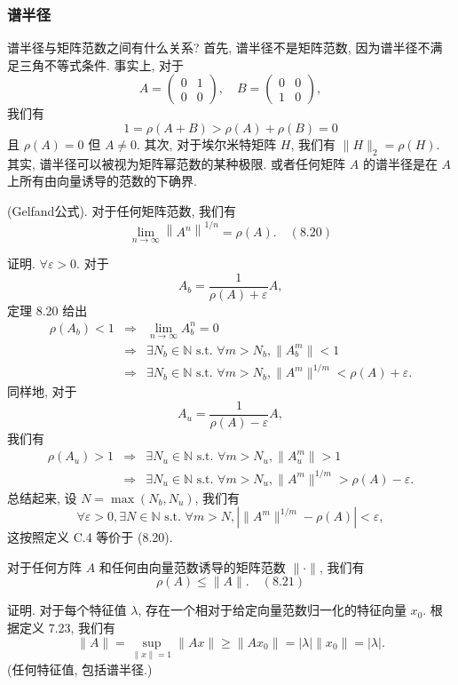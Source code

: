 \documentclass[a4paper]{ctexart}
\newcommand{\hl}[1]
{\noindent {\bf {#1}}}
\begin{document}
{\subsubsection{谱半径}

谱半径与矩阵范数之间有什么关系? 首先, 谱半径不是矩阵范数, 
因为谱半径不满足三角不等式条件. 事实上, 对于
$$
A = \begin{pmatrix} 0 & 1 \\ 0 & 0 \end{pmatrix}, 
\quad B = \begin{pmatrix} 0 & 0 \\ 1 & 0 \end{pmatrix}, 
$$
我们有 
$$ 
1 = \rho(A + B) > \rho(A) + \rho(B) = 0
$$ 
且 $\rho(A) = 0$ 但 $A \neq 0$. 
其次, 对于埃尔米特矩阵 $H$, 我们有 $\|H\|_2 = \rho(H)$. 
其实, 谱半径可以被视为矩阵幂范数的某种极限. 
或者任何矩阵 $A$ 的谱半径是在 $A$ 上所有由向量诱导的范数的下确界.

\hl{定理 8.24} (Gelfand公式). 
对于任何矩阵范数, 我们有
$$ 
\lim_{n \to \infty} \left\| A^n \right\|^{1/n} = \rho(A). \quad (8.20) 
$$

证明. $\forall \varepsilon > 0$. 对于 
$$
A_b = \frac{1}{\rho(A) + \varepsilon}A,
$$
定理 8.20 给出
\begin{eqnarray*}
\rho(A_b) < 1 &\Rightarrow& \lim_{n \to \infty} A^n_b = 0 \\
&\Rightarrow& \exists N_b \in \mathbb{N} \text{ s.t. } 
\forall m > N_b, \|A^m_b\| < 1 \\
&\Rightarrow& \exists N_b \in \mathbb{N} \text{ s.t. } \forall m > N_b, 
\|A^m\|^{1/m} < \rho(A) + \varepsilon. 
\end{eqnarray*}
同样地, 对于 
$$
A_u = \frac{1}{\rho(A) - \varepsilon}A,
$$
我们有
\begin{eqnarray*}
\rho(A_u) > 1 &\Rightarrow& 
\exists N_u \in \mathbb{N} \text{ s.t. } \forall m > N_u, \|A^m_u\| > 1 \\
&\Rightarrow& \exists N_u \in \mathbb{N} \text{ s.t. } \forall m > N_u, 
\|A^m\|^{1/m} > \rho(A) - \varepsilon. 
\end{eqnarray*}
总结起来, 设 $N = \max(N_b, N_u)$, 我们有
$$
\forall \varepsilon > 0, 
\exists N \in \mathbb{N} \text{ s.t. } \forall m > N, 
\left| \|A^m\|^{1/m} - \rho(A) \right| < \varepsilon, 
$$
这按照定义 C.4 等价于 (8.20).

\hl{引理 8.25} 对于任何方阵 $A$ 和任何由向量范数诱导的矩阵范数 $\|\cdot\|$, 
我们有
$$ 
\rho(A) \leq \|A\|. \quad (8.21) 
$$

证明. 对于每个特征值 $\lambda$, 
存在一个相对于给定向量范数归一化的特征向量 $x_0$. 
根据定义 7.23, 
我们有
$$
\|A\| = \sup_{\|x\| = 1} \|Ax\| \geq \|Ax_0\| = |\lambda|\|x_0\| = |\lambda|. 
$$
(任何特征值, 包括谱半径.)

}
\end{document}

